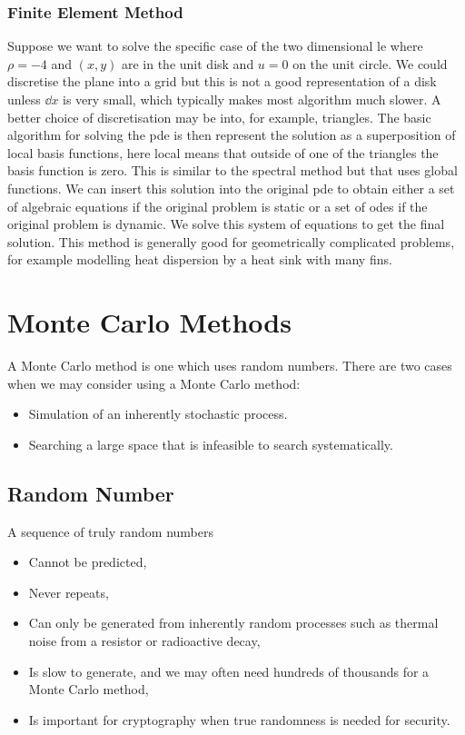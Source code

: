 \documentclass[a4paper]{article}
\begin{document}
    \subsubsection{Finite Element Method}
    Suppose we want to solve the specific case of the two dimensional \gls{le} where \(\rho = -4\) and \((x, y)\) are in the unit disk and \(u = 0\) on the unit circle.
    We could discretise the plane into a grid but this is not a good representation of a disk unless \(\dd{x}\) is very small, which typically makes most algorithm much slower.
    A better choice of discretisation may be into, for example, triangles.
    The basic algorithm for solving the \gls{pde} is then represent the solution as a superposition of local basis functions, here local means that outside of one of the triangles the basis function is zero.
    This is similar to the spectral method but that uses global functions.
    We can insert this solution into the original \gls{pde} to obtain either a set of algebraic equations if the original problem is static or a set of \glspl{ode} if the original problem is dynamic.
    We solve this system of equations to get the final solution.
    This method is generally good for geometrically complicated problems, for example modelling heat dispersion by a heat sink with many fins.
    
    \section{Monte Carlo Methods}
    A Monte Carlo method is one which uses random numbers.
    There are two cases when we may consider using a Monte Carlo method:
    \begin{itemize}
        \item Simulation of an inherently stochastic process.
        \item Searching a large space that is infeasible to search systematically.
    \end{itemize}
    
    \subsection{Random Number}
    A sequence of truly random numbers
    \begin{itemize}
        \item Cannot be predicted,
        \item Never repeats,
        \item Can only be generated from inherently random processes such as thermal noise from a resistor or radioactive decay,
        \item Is slow to generate, and we may often need hundreds of thousands for a Monte Carlo method,
        \item Is important for cryptography when true randomness is needed for security.
    \end{itemize}
    
\end{document}
